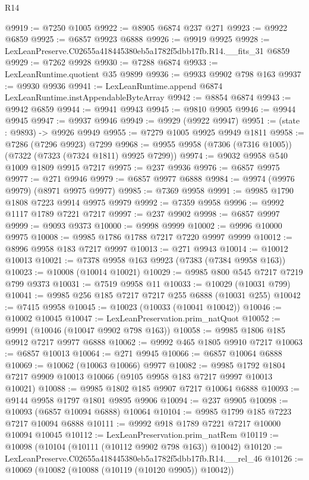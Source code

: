 \begin{lexlean}{R14}
\begin{coremodule}
@9919 := @7250 @1005
@9922 := @8905 @6874 @237 @271
@9923 := @9922 @6859
@9925 := @6857 @9923 @6888
@9926 := @9919 @9925
@9928 := LexLeanPreserve.C02655a418445380eb5a1782f5dbb17fb.R14.__fits_31 @6859
@9929 := @7262 @9928
@9930 := @7288 @6874
@9933 := LexLeanRuntime.quotient @35 @9899
@9936 := @9933 @9902 @798 @163
@9937 := @9930 @9936
@9941 := LexLeanRuntime.append @6874 LexLeanRuntime.instAppendableByteArray
@9942 := @8854 @6874
@9943 := @9942 @6859
@9944 := @9941 @9943
@9945 := @9810 @9905
@9946 := @9944 @9945
@9947 := @9937 @9946
@9949 := @9929 (@9922 @9947)
@9951 := (state : @9893) -> @9926 @9949
@9955 := @7279 @1005 @9925 @9949 @1811
@9958 := @7286 (@7296 @9923) @7299
@9968 := @9955 @9958 (@7306 (@7316 @1005)) (@7322 (@7323 (@7324 @1811) @9925 @7299))
@9974 := @9032 @9958 @540 @1009 @1809 @9915 @7217
@9975 := @237 @9936
@9976 := @6857 @9975
@9977 := @271 @9946
@9979 := @6857 @9977 @6888
@9984 := @9974 (@9976 @9979) (@8971 @9975 @9977)
@9985 := @7369 @9958
@9991 := @9985 @1790 @1808 @7223 @9914 @9975 @9979
@9992 := @7359 @9958
@9996 := @9992 @1117 @1789 @7221 @7217
@9997 := @237 @9902
@9998 := @6857 @9997
@9999 := @9093 @9373
@10000 := @9998 @9999
@10002 := @9996 @10000 @9975
@10008 := @9985 @1786 @1788 @7217 @7220 @9997 @9999
@10012 := @8996 @9958 @183 @7217 @9997
@10013 := @271 @9943
@10014 := @10012 @10013
@10021 := @7378 @9958 @163 @9923 (@7383 (@7384 @9958 @163))
@10023 := @10008 (@10014 @10021)
@10029 := @9985 @800 @545 @7217 @7219 @799 @9373
@10031 := @7519 @9958 @11
@10033 := @10029 (@10031 @799)
@10041 := @9985 @256 @185 @7217 @7217 @255 @6888 (@10031 @255)
@10042 := @7415 @9958
@10045 := @10023 (@10033 (@10041 @10042))
@10046 := @10002 @10045
@10047 := LexLeanPreservation.prim_natQuot
@10052 := @9991 (@10046 (@10047 @9902 @798 @163))
@10058 := @9985 @1806 @185 @9912 @7217 @9977 @6888
@10062 := @9992 @465 @1805 @9910 @7217
@10063 := @6857 @10013
@10064 := @271 @9945
@10066 := @6857 @10064 @6888
@10069 := @10062 (@10063 @10066) @9977
@10082 := @9985 @1792 @1804 @7217 @9909 @10013 @10066 (@9105 @9958 @183 @7217 @9997 @10013 @10021)
@10088 := @9985 @1802 @185 @9907 @7217 @10064 @6888
@10093 := @9144 @9958 @1797 @1801 @9895 @9906
@10094 := @237 @9905
@10098 := @10093 (@6857 @10094 @6888) @10064
@10104 := @9985 @1799 @185 @7223 @7217 @10094 @6888
@10111 := @9992 @918 @1789 @7221 @7217 @10000 @10094 @10045
@10112 := LexLeanPreservation.prim_natRem
@10119 := @10098 (@10104 (@10111 (@10112 @9902 @798 @163)) @10042)
@10120 := LexLeanPreserve.C02655a418445380eb5a1782f5dbb17fb.R14.__rel_46
@10126 := @10069 (@10082 (@10088 (@10119 (@10120 @9905)) @10042))

\end{coremodule}
\end{lexlean}
